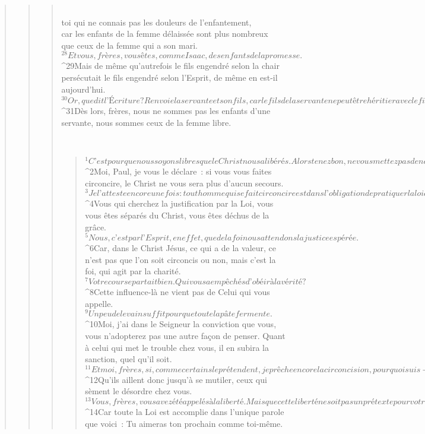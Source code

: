 \begin{verse}
\begin{verse}
\begin{verse}
        \\toi qui ne connais pas les douleurs de l’enfantement,
        \\car les enfants de la femme délaissée sont plus nombreux
        \\que ceux de la femme qui a son mari.
${}^{28}Et vous, frères, vous êtes, comme Isaac, des enfants de la promesse. 
${}^{29}Mais de même qu’autrefois le fils engendré selon la chair persécutait le fils engendré selon l’Esprit, de même en est-il aujourd’hui. 
${}^{30}Or, que dit l’Écriture ? Renvoie la servante et son fils, car le fils de la servante ne peut être héritier avec le fils de la femme libre.
${}^{31}Dès lors, frères, nous ne sommes pas les enfants d’une servante, nous sommes ceux de la femme libre.
      
         
      \bchapter{}
      \begin{verse}
${}^{1}C’est pour que nous soyons libres que le Christ nous a libérés. Alors tenez bon, ne vous mettez pas de nouveau sous le joug de l’esclavage. 
${}^{2}Moi, Paul, je vous le déclare : si vous vous faites circoncire, le Christ ne vous sera plus d’aucun secours. 
${}^{3}Je l’atteste encore une fois : tout homme qui se fait circoncire est dans l’obligation de pratiquer la loi de Moïse tout entière. 
${}^{4}Vous qui cherchez la justification par la Loi, vous vous êtes séparés du Christ, vous êtes déchus de la grâce. 
${}^{5}Nous, c’est par l’Esprit, en effet, que de la foi nous attendons la justice espérée. 
${}^{6}Car, dans le Christ Jésus, ce qui a de la valeur, ce n’est pas que l’on soit circoncis ou non, mais c’est la foi, qui agit par la charité.
${}^{7}Votre course partait bien. Qui vous a empêchés d’obéir à la vérité ? 
${}^{8}Cette influence-là ne vient pas de Celui qui vous appelle. 
${}^{9}Un peu de levain suffit pour que toute la pâte fermente. 
${}^{10}Moi, j’ai dans le Seigneur la conviction que vous, vous n’adopterez pas une autre façon de penser. Quant à celui qui met le trouble chez vous, il en subira la sanction, quel qu’il soit. 
${}^{11}Et moi, frères, si, comme certains le prétendent, je prêche encore la circoncision, pourquoi suis-je encore persécuté ? Car alors cette prédication abolirait le scandale de la Croix. 
${}^{12}Qu’ils aillent donc jusqu’à se mutiler, ceux qui sèment le désordre chez vous.
${}^{13}Vous, frères, vous avez été appelés à la liberté. Mais que cette liberté ne soit pas un prétexte pour votre égoïsme ; au contraire, mettez-vous, par amour, au service les uns des autres. 
${}^{14}Car toute la Loi est accomplie dans l’unique parole que voici : Tu aimeras ton prochain comme toi-même. 

\end{verse}
\end{verse}
\end{verse}
\end{verse}
